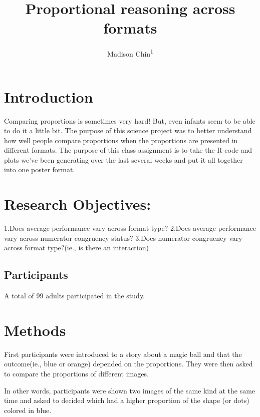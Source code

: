 \documentclass[
  man,floatsintext]{apa6}
\title{Proportional reasoning across formats}
\author{Madison Chin\textsuperscript{1}}
\date{}
\affiliation{\vspace{0.5cm}\textsuperscript{1} Rutgers University}
\begin{document}
\maketitle

\section{Introduction}\label{introduction}

Comparing proportions is sometimes very hard! But, even infants seem to be able to do it a little bit. The purpose of this science project was to better understand how well people compare proportions when the proportions are presented in different formats. The purpose of this class assignment is to take the R-code and plots we've been generating over the last several weeks and put it all together into one poster format.

\section{Research Objectives:}\label{research-objectives}

1.Does average performance vary across format type?
2.Does average performance vary across numerator congruency status?
3.Does numerator congruency vary across format type?(ie., is there an interaction)

\subsection{Participants}\label{participants}

A total of 99 adults participated in the study.

\section{Methods}\label{methods}

First participants were introduced to a story about a magic ball and that the outcome(ie., blue or orange) depended on the proportions. They were then asked to compare the proportions of different images.

In other words, participants were shown two images of the same kind at the same time and asked to decided which had a higher proportion of the shape (or dots) colored in blue.
\end{document}
